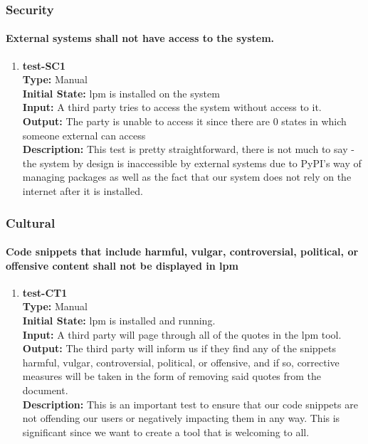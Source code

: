 \documentclass[12pt, titlepage]{article}
\begin{document}
\subsubsection{Security}
\paragraph{External systems shall not have access to the system.}
\begin{enumerate}
    \item{\textbf{test-SC1}\\}
    \textbf{Type:} Manual\\
    \textbf{Initial State:} lpm is installed on the system \\
    \textbf{Input:} A third party tries to access the system without access to it.\\
    \textbf{Output:} The party is unable to access it since there are 0 states in which someone external can access \\
    \textbf{Description:} This test is pretty straightforward, there is not much to say - the system by design is inaccessible by external systems due to PyPI's way of managing packages as well as the fact that our system does not rely on the internet after it is installed.\\
\end{enumerate}

\subsubsection{Cultural}
\paragraph{Code snippets that include harmful, vulgar, controversial, political, or offensive
content shall not be displayed in lpm}
\begin{enumerate}
    \item{\textbf{test-CT1}\\}
    \textbf{Type:} Manual\\
    \textbf{Initial State:} lpm is installed and running.\\
    \textbf{Input:} A third party will page through all of the quotes in the lpm tool.\\
    \textbf{Output:} The third party will inform us if they find any of the snippets harmful, vulgar, controversial, political, or offensive, and if so, corrective measures will be taken in the form of removing said quotes from the document. \\
    \textbf{Description:} This is an important test to ensure that our code snippets are not offending our users or negatively impacting them in any way. This is significant since we want to create a tool that is welcoming to all.\\
\end{enumerate}
\end{document}
